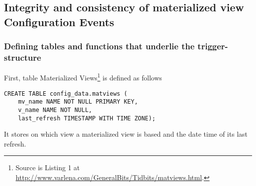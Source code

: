 \subsection{Integrity and consistency of materialized view Configuration Events}\label{integrity_and_consistency_of_MV}

\subsubsection{Defining tables and functions that underlie the trigger-structure}
First, table Materialized Views\label{table_Materialized_Views}\footnote{Source is Listing 1 at \url{http://www.varlena.com/GeneralBits/Tidbits/matviews.html}.} 
 is defined as follows 
\begin{lstlisting}[language=postgreSQL] 
CREATE TABLE config_data.matviews ( 
	mv_name NAME NOT NULL PRIMARY KEY, 
	v_name NAME NOT NULL,  
	last_refresh TIMESTAMP WITH TIME ZONE);
\end{lstlisting}

It stores on which view a materialized view is based and the date time of its last refresh.

